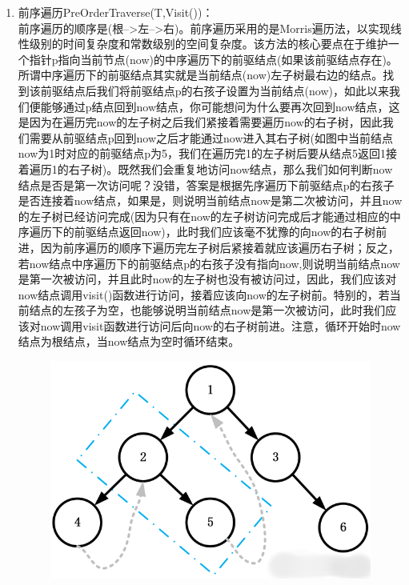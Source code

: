 \documentclass[supercite]{Experimental_Report}
\theoremstyle{definition}
\begin{document}
\begin{enumerate}
    \item 前序遍历PreOrderTraverse(T,Visit())：\\前序遍历的顺序是(根-->左-->右)。前序遍历采用的是Morris遍历法，以实现线性级别的时间复杂度和常数级别的空间复杂度。该方法的核心要点在于维护一个指针p指向当前节点(now)的中序遍历下的前驱结点(如果该前驱结点存在)。所谓中序遍历下的前驱结点其实就是当前结点(now)左子树最右边的结点。找到该前驱结点后我们将前驱结点p的右孩子设置为当前结点(now)，如此以来我们便能够通过p结点回到now结点，你可能想问为什么要再次回到now结点，这是因为在遍历完now的左子树之后我们紧接着需要遍历now的右子树，因此我们需要从前驱结点p回到now之后才能通过now进入其右子树(如图中当前结点now为1时对应的前驱结点p为5，我们在遍历完1的左子树后要从结点5返回1接着遍历1的右子树)。既然我们会重复地访问now结点，那么我们如何判断now结点是否是第一次访问呢？没错，答案是根据先序遍历下前驱结点p的右孩子是否连接着now结点，如果是，则说明当前结点now是第二次被访问，并且now的左子树已经访问完成(因为只有在now的左子树访问完成后才能通过相应的中序遍历下的前驱结点返回now)，此时我们应该毫不犹豫的向now的右子树前进，因为前序遍历的顺序下遍历完左子树后紧接着就应该遍历右子树；反之，若now结点中序遍历下的前驱结点p的右孩子没有指向now,则说明当前结点now是第一次被访问，并且此时now的左子树也没有被访问过，因此，我们应该对now结点调用visit()函数进行访问，接着应该向now的左子树前。特别的，若当前结点的左孩子为空，也能够说明当前结点now是第一次被访问，此时我们应该对now调用visit函数进行访问后向now的右子树前进。注意，循环开始时now结点为根结点，当now结点为空时循环结束。
    \begin{figure}%
		\begin{center}
			\includegraphics[scale=0.40]{images/morrisTraverse.png}
			\label{morrisTraverse}

\end{center}
\end{figure}
\end{enumerate}
\end{document}
